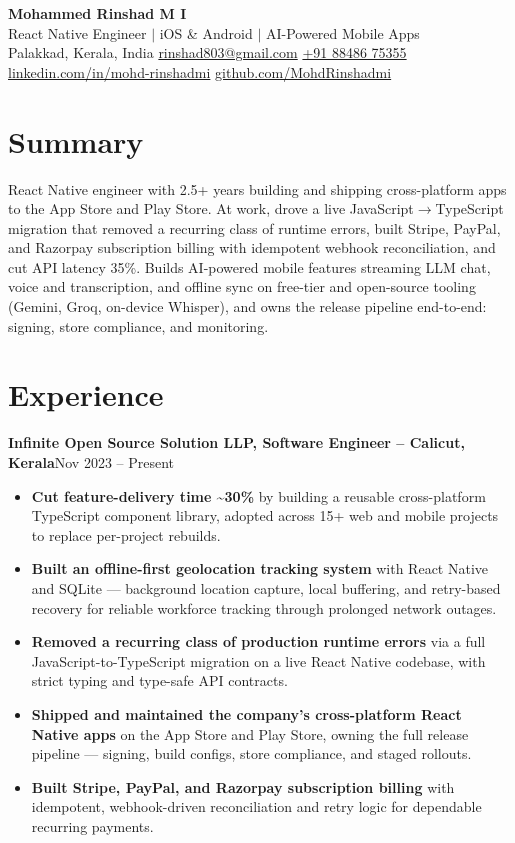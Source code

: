 \documentclass[a4paper,10pt]{article}
\newcommand{\entry}[2]{%
  \noindent\textbf{#1}\hfill{#2}\par
}
\begin{document}
\begin{center}
  {\LARGE\bfseries Mohammed Rinshad M I}\\[3pt]
  {\small React Native Engineer $\vert$ iOS \& Android $\vert$ AI-Powered Mobile Apps}\\[4pt]
  {\footnotesize
    Palakkad, Kerala, India \quad\textbullet\quad
    \href{mailto:rinshad803@gmail.com}{rinshad803@gmail.com} \quad\textbullet\quad
    \href{tel:+918848675355}{+91 88486 75355} \\[2pt]
    \href{https://linkedin.com/in/mohd-rinshadmi}{linkedin.com/in/mohd-rinshadmi} \quad\textbullet\quad
    \href{https://github.com/MohdRinshadmi}{github.com/MohdRinshadmi}
  }
\end{center}

\section{Summary}
React Native engineer with 2.5+ years building and shipping cross-platform apps to the App Store and Play Store. At work, drove a live JavaScript$\rightarrow$TypeScript migration that removed a recurring class of runtime errors, built Stripe, PayPal, and Razorpay subscription billing with idempotent webhook reconciliation, and cut API latency 35\%. Builds AI-powered mobile features streaming LLM chat, voice and transcription, and offline sync on free-tier and open-source tooling (Gemini, Groq, on-device Whisper), and owns the release pipeline end-to-end: signing, store compliance, and monitoring.

\section{Experience}
\entry{Infinite Open Source Solution LLP, Software Engineer -- Calicut, Kerala}{Nov 2023 -- Present}
\begin{itemize}
  \item \textbf{Cut feature-delivery time \textasciitilde30\%} by building a reusable cross-platform TypeScript component library, adopted across 15+ web and mobile projects to replace per-project rebuilds.
  \item \textbf{Built an offline-first geolocation tracking system} with React Native and SQLite --- background location capture, local buffering, and retry-based recovery for reliable workforce tracking through prolonged network outages.
  \item \textbf{Removed a recurring class of production runtime errors} via a full JavaScript-to-TypeScript migration on a live React Native codebase, with strict typing and type-safe API contracts.
  \item \textbf{Shipped and maintained the company's cross-platform React Native apps} on the App Store and Play Store, owning the full release pipeline --- signing, build configs, store compliance, and staged rollouts.
  \item \textbf{Built Stripe, PayPal, and Razorpay subscription billing} with idempotent, webhook-driven reconciliation and retry logic for dependable recurring payments.
\end{itemize}
\end{document}

